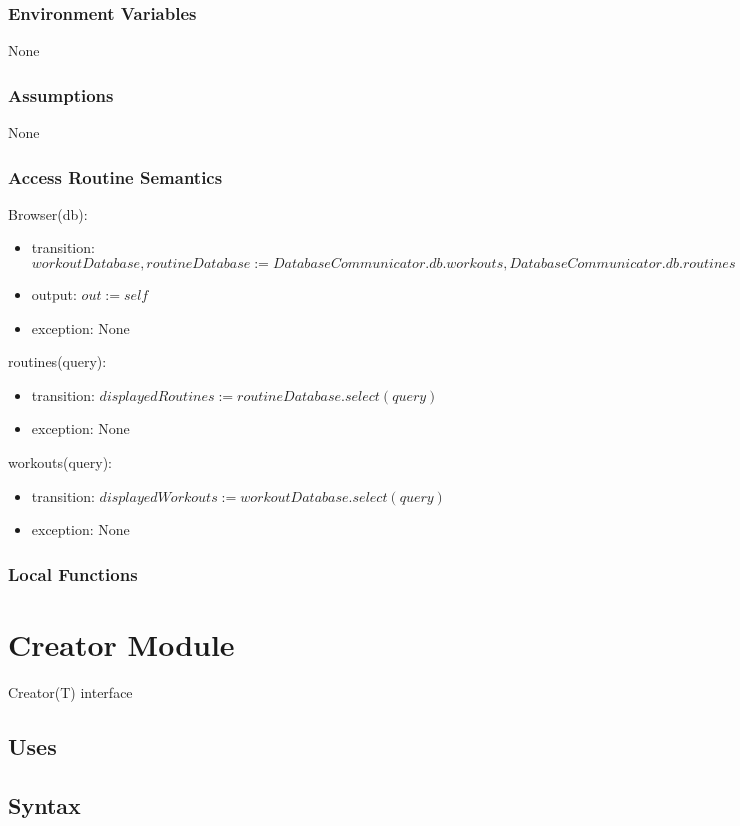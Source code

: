 \documentclass[12pt, titlepage]{article}
\begin{document}
\subsubsection{Environment Variables}
None
\subsubsection{Assumptions}
None
\subsubsection{Access Routine Semantics}

\noindent Browser(db):
\begin{itemize}
	\item transition: $workoutDatabase, routineDatabase := DatabaseCommunicator.db.workouts, DatabaseCommunicator.db.routines$
	\item output: $out := self$
	\item exception: None
\end{itemize}

\noindent routines(query):
\begin{itemize}
	\item transition: $displayedRoutines := routineDatabase.select(query)$
	\item exception: None
\end{itemize}

\noindent workouts(query):
\begin{itemize}
	\item transition: $displayedWorkouts := workoutDatabase.select(query)$
	\item exception: None
\end{itemize}

\subsubsection{Local Functions}

\newpage

\section{Creator Module}
Creator(T) interface
\subsection{Uses}

\subsection{Syntax}
\end{document}

